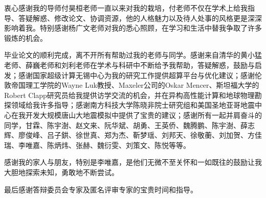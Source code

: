 \begin{acknowledgement}

衷心感谢我的导师付昊桓老师一直以来对我的栽培，付老师不仅在学术上给我指导、答疑解惑、修改论文、协调资源，他的人格魅力以及待人处事的风格更是深深影响着我。特别感谢杨广文老师对我的悉心照顾，在学习和生活中替我争取了许多锻炼的机会。

毕业论文的顺利完成，离不开所有帮助过我的老师与同学。感谢来自清华的黄小猛老师、薛巍老师和刘利老师在学术与科研中不断给予我帮助，答疑解惑，鼓励与启发；感谢国家超级计算无锡中心为我的研究工作提供超算平台与优化建议；感谢伦敦帝国理工学院的Wayne Luk教授、Maxeler公司的Oskar Mencer、斯坦福大学的Robert Clapp研究员给我提供访学交流的机会，并在异构高性能计算和地球物理勘探领域给我许多指导；感谢南方科技大学陈晓非院士研究组和美国圣地亚哥地震中心在我开发大规模唐山大地震模拟中提供了宝贵的建议；感谢所有一起并肩奋斗的同学，甘霖、陈宇澍、赵文来、阮华斌、胡勇、王英侨、魏腾鹏、陈宇澍、薛志辉、廖俊峰、吕子鉷、徐世真、郑为杰、靳梦瑶、刘邦天、徐敬蘅、刘加贺、方佳瑞、李唯嘉、陈炳炜、张赫、魏衍雯、刘策文、陈悦等等。

感谢我的家人与朋友，特别是李唯嘉，是他们无微不至关怀和一如既往的鼓励让我大胆地探索未知，勇敢地不断尝试。

最后感谢答辩委员会专家及匿名评审专家的宝贵时间和指导。
\end{acknowledgement}
